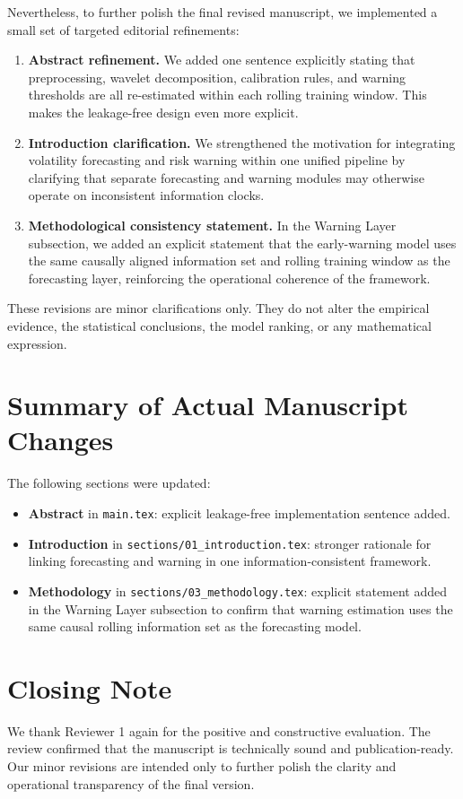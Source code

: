\documentclass[11pt,a4paper]{article}
\begin{document}
Nevertheless, to further polish the final revised manuscript, we implemented a small set of targeted editorial refinements:
\begin{enumerate}[leftmargin=1.6em]
\item \textbf{Abstract refinement.} We added one sentence explicitly stating that preprocessing, wavelet decomposition, calibration rules, and warning thresholds are all re-estimated within each rolling training window. This makes the leakage-free design even more explicit.

\item \textbf{Introduction clarification.} We strengthened the motivation for integrating volatility forecasting and risk warning within one unified pipeline by clarifying that separate forecasting and warning modules may otherwise operate on inconsistent information clocks.

\item \textbf{Methodological consistency statement.} In the Warning Layer subsection, we added an explicit statement that the early-warning model uses the same causally aligned information set and rolling training window as the forecasting layer, reinforcing the operational coherence of the framework.
\end{enumerate}

These revisions are minor clarifications only. They do not alter the empirical evidence, the statistical conclusions, the model ranking, or any mathematical expression.

\section*{Summary of Actual Manuscript Changes}

The following sections were updated:
\begin{itemize}[leftmargin=1.5em]
\item \textbf{Abstract} in \texttt{main.tex}: explicit leakage-free implementation sentence added.
\item \textbf{Introduction} in \texttt{sections/01\_introduction.tex}: stronger rationale for linking forecasting and warning in one information-consistent framework.
\item \textbf{Methodology} in \texttt{sections/03\_methodology.tex}: explicit statement added in the Warning Layer subsection to confirm that warning estimation uses the same causal rolling information set as the forecasting model.
\end{itemize}

\section*{Closing Note}

We thank Reviewer 1 again for the positive and constructive evaluation. The review confirmed that the manuscript is technically sound and publication-ready. Our minor revisions are intended only to further polish the clarity and operational transparency of the final version.
\end{document}
